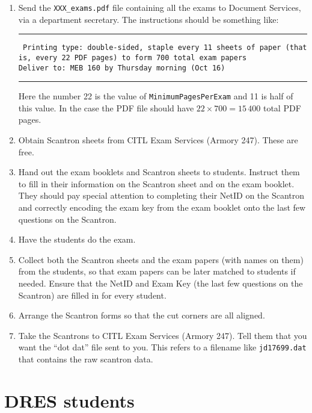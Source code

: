 \documentclass{article}
\begin{document}
\begin{enumerate}
\item Send the \texttt{XXX_exams.pdf} file
  containing all the exams to Document Services, via a department
  secretary. The instructions should be something like:

  \rule{\linewidth}{0.5pt}

  \parbox{\linewidth}{
    \tt
    Printing type: double-sided, staple every 11 sheets of paper (that is, every 22 PDF pages) to form 700 total exam papers \\
    Deliver to: MEB 160 by Thursday morning (Oct 16)
  }

  \rule{\linewidth}{0.5pt}

  Here the number 22 is the value of \texttt{MinimumPagesPerExam} and
  11 is half of this value. In the case the PDF file should have $22
  \times 700 = 15\,400$ total PDF pages.
\item Obtain Scantron sheets from CITL Exam Services (Armory
  247). These are free.
\item Hand out the exam booklets and Scantron sheets to
  students. Instruct them to fill in their information on the Scantron
  sheet and on the exam booklet. They should pay special attention to
  completing their NetID on the Scantron and correctly encoding the
  exam key from the exam booklet onto the last few questions on the
  Scantron.
\item Have the students do the exam.
\item Collect both the Scantron sheets and the exam papers (with names
  on them) from the students, so that exam papers can be later matched
  to students if needed. Ensure that the NetID and Exam Key (the last
  few questions on the Scantron) are filled in for every student.
\item Arrange the Scantron forms so that the cut corners are all
  aligned.
\item Take the Scantrons to CITL Exam Services (Armory 247). Tell them
  that you want the ``dot dat'' file sent to you. This refers to a
  filename like \texttt{jd17699.dat} that contains the raw scantron
  data.
\end{enumerate}

\section{DRES students}
\end{document}
